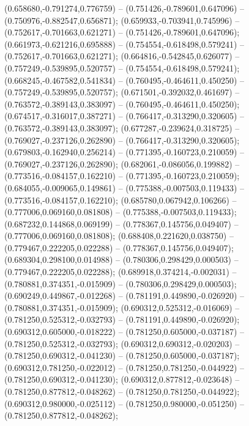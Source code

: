  (0.658680,-0.791274,0.776759) -- (0.751426,-0.789601,0.647096) -- (0.750976,-0.882547,0.656871);
 (0.659933,-0.703941,0.745996) -- (0.752617,-0.701663,0.621271) -- (0.751426,-0.789601,0.647096);
 (0.661973,-0.621216,0.695888) -- (0.754554,-0.618498,0.579241) -- (0.752617,-0.701663,0.621271);
 (0.664816,-0.542845,0.626077) -- (0.757249,-0.539895,0.520757) -- (0.754554,-0.618498,0.579241);
 (0.668245,-0.467582,0.541834) -- (0.760495,-0.464611,0.450250) -- (0.757249,-0.539895,0.520757);
 (0.671501,-0.392032,0.461697) -- (0.763572,-0.389143,0.383097) -- (0.760495,-0.464611,0.450250);
 (0.674517,-0.316017,0.387271) -- (0.766417,-0.313290,0.320605) -- (0.763572,-0.389143,0.383097);
 (0.677287,-0.239624,0.318725) -- (0.769027,-0.237126,0.262890) -- (0.766417,-0.313290,0.320605);
 (0.679803,-0.162940,0.256214) -- (0.771395,-0.160723,0.210059) -- (0.769027,-0.237126,0.262890);
 (0.682061,-0.086056,0.199882) -- (0.773516,-0.084157,0.162210) -- (0.771395,-0.160723,0.210059);
 (0.684055,-0.009065,0.149861) -- (0.775388,-0.007503,0.119433) -- (0.773516,-0.084157,0.162210);
 (0.685780,0.067942,0.106266) -- (0.777006,0.069160,0.081808) -- (0.775388,-0.007503,0.119433);
 (0.687232,0.144868,0.069199) -- (0.778367,0.145756,0.049407) -- (0.777006,0.069160,0.081808);
 (0.688408,0.221620,0.038750) -- (0.779467,0.222205,0.022288) -- (0.778367,0.145756,0.049407);
 (0.689304,0.298100,0.014988) -- (0.780306,0.298429,0.000503) -- (0.779467,0.222205,0.022288);
 (0.689918,0.374214,-0.002031) -- (0.780881,0.374351,-0.015909) -- (0.780306,0.298429,0.000503);
 (0.690249,0.449867,-0.012268) -- (0.781191,0.449890,-0.026920) -- (0.780881,0.374351,-0.015909);
 (0.690312,0.525312,-0.016069) -- (0.781250,0.525312,-0.032793) -- (0.781191,0.449890,-0.026920);
 (0.690312,0.605000,-0.018222) -- (0.781250,0.605000,-0.037187) -- (0.781250,0.525312,-0.032793);
 (0.690312,0.690312,-0.020203) -- (0.781250,0.690312,-0.041230) -- (0.781250,0.605000,-0.037187);
 (0.690312,0.781250,-0.022012) -- (0.781250,0.781250,-0.044922) -- (0.781250,0.690312,-0.041230);
 (0.690312,0.877812,-0.023648) -- (0.781250,0.877812,-0.048262) -- (0.781250,0.781250,-0.044922);
 (0.690312,0.980000,-0.025112) -- (0.781250,0.980000,-0.051250) -- (0.781250,0.877812,-0.048262);
